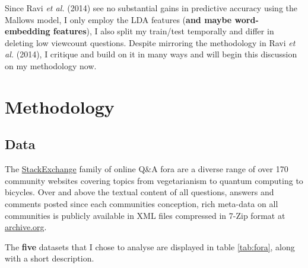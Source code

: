 \documentclass[11pt,preprint, authoryear]{article}
\numberwithin{equation}{section}
\begin{document}
Since Ravi \emph{et al.} (2014) see no substantial gains in predictive
accuracy using the Mallows model, I only employ the LDA features
(\textbf{and maybe word-embedding features}), I also split my train/test
temporally and differ in deleting low viewcount questions. Despite
mirroring the methodology in Ravi \emph{et al.} (2014), I critique and
build on it in many ways and will begin this discussion on my
methodology now.

\newpage

\section{\texorpdfstring{Methodology
\label{Method}}{Methodology }}\label{methodology}

\subsection{\texorpdfstring{Data \label{Data}}{Data }}\label{data}

The \href{https://stackexchange.com/sites\#traffic}{StackExchange}
family of online Q\&A fora are a diverse range of over 170 community
websites covering topics from vegetarianism to quantum computing to
bicycles. Over and above the textual content of all questions, answers
and comments posted since each communities conception, rich meta-data on
all communities is publicly available in XML files compressed in 7-Zip
format at \href{http://archive.org/download/stackexchange}{archive.org}.

The \textbf{five} datasets that I chose to analyse are displayed in
table \ref{tab:fora}, along with a short description.

\footnotesize
\end{document}
